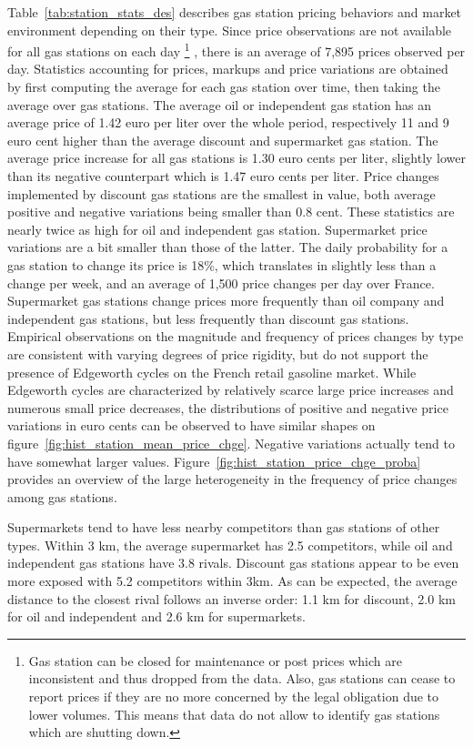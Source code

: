 \documentclass[english]{article}
\begin{document}
Table~\ref{tab:station_stats_des} describes gas station pricing behaviors and market environment depending on their type. Since price observations are not available for all gas stations on each day%
\footnote{Gas station can be closed for maintenance or post prices which are inconsistent and thus dropped from the data. Also, gas stations can cease to report prices if they are no more concerned by the legal obligation due to lower volumes. This means that data do not allow to identify gas stations which are shutting down.}%
, there is an average of 7,895 prices observed per day. Statistics accounting for prices, markups and price variations are obtained by first computing the average for each gas station over time, then taking the average over gas stations. The average oil or independent gas station has an average price of 1.42 euro per liter over the whole period, respectively 11 and 9 euro cent higher than the average discount and supermarket gas station. The average price increase for all gas stations is 1.30 euro cents per liter, slightly lower than its negative counterpart which is 1.47 euro cents per liter. Price changes implemented by discount gas stations are the smallest in value, both average positive and negative variations being smaller than 0.8 cent. These statistics are nearly twice as high for oil and independent gas station. Supermarket price variations are a bit smaller than those of the latter. The daily probability for a gas station to change its price is 18\%, which translates in slightly less than a change per week, and an average of 1,500 price changes per day over France. Supermarket gas stations change prices more frequently than oil company and independent gas stations, but less frequently than discount gas stations. Empirical observations on the magnitude and frequency of prices changes by type are consistent with varying degrees of price rigidity, but do not support the presence of Edgeworth cycles on the French retail gasoline market. While Edgeworth cycles are characterized by relatively scarce large price increases and numerous small price decreases, the distributions of positive and negative price variations in euro cents can be observed to have similar shapes on figure~\ref{fig:hist_station_mean_price_chge}. Negative variations actually tend to have somewhat larger values. Figure~\ref{fig:hist_station_price_chge_proba} provides an overview of the large heterogeneity in the frequency of price changes among gas stations.

Supermarkets tend to have less nearby competitors than gas stations of other types. Within 3 km, the average supermarket has 2.5 competitors, while oil and independent gas stations have 3.8 rivals. Discount gas stations appear to be even more exposed with 5.2 competitors within 3km. As can be expected, the average distance to the closest rival follows an inverse order: 1.1 km for discount, 2.0 km for oil and independent and 2.6 km for supermarkets.
\end{document}
